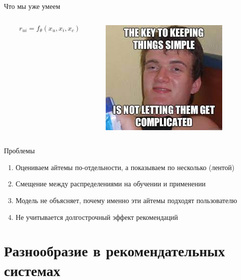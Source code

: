 \documentclass[11pt,aspectratio=169,handout]{beamer}
\begin{document}
\begin{frame}{Что мы уже умеем}

\begin{columns}

\begin{column}{0.55\textwidth}
\begin{center}
\begin{tcolorbox}[colback=info!5,colframe=info!80,title=]
\begin{large}
\[
\hat r_{ui} = f_{\theta}(x_u, x_i, x_c)
\]
\end{large}
\end{tcolorbox}\end{center}
\end{column}

\begin{column}{0.35\textwidth} 
\begin{center}
\includegraphics[scale=0.4]{images/simple.jpeg}
\end{center}
\end{column}
\end{columns}

\vfill

Проблемы
\begin{enumerate}[<+->]
\item Оцениваем айтемы по-отдельности, а показываем по несколько (лентой)
\item Смещение между распределениями на обучении и применении
\item Модель не объясняет, почему именно эти айтемы подходят пользователю
\item {\color{blue} Не учитывается долгострочный эффект рекомендаций}
\end{enumerate}

\end{frame}

\section{Разнообразие в рекомендательных системах}
\end{document}
